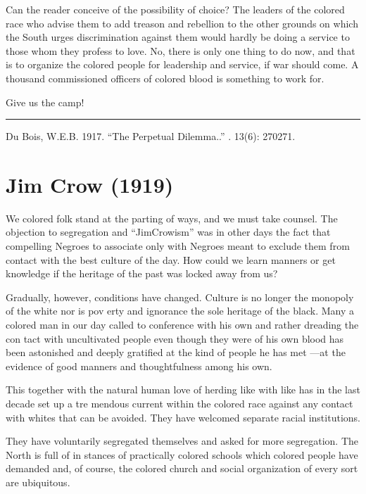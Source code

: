 \documentclass[letterpaper,10pt,english]{jupyterBook}
\begin{document}
\sphinxAtStartPar
Can the reader conceive of the pos­sibility of choice? The leaders of the colored race who advise them to add treason and rebellion to the other grounds on which the South urges discrimination against them would hardly be doing a service to those whom they profess to love. No, there is only one thing to do now, and that is to organize the colored people for leadership and service, if war should come. A thousand commissioned officers of colored blood is something to work for.

\sphinxAtStartPar
Give us the camp!


\bigskip\hrule\bigskip


\sphinxAtStartPar
{} Du Bois, W.E.B. 1917. “The Perpetual Dilemma..” . 13(6): 270\sphinxhyphen{}271.


\section{Jim Crow (1919)}
\label{\detokenize{Volumes/17/03/jim_crow:jim-crow-1919}}\label{\detokenize{Volumes/17/03/jim_crow::doc}}
\sphinxAtStartPar
We  colored folk stand at the parting of ways, and we must take counsel. The objection to segregation and “Jim\sphinxhyphen{}Crowism” was in other days the fact that compelling Ne­groes to associate only with Negroes meant to exclude them from contact with the best culture of the day. How could we learn manners or get knowledge if the heritage of the past was locked away from us?

\sphinxAtStartPar
Gradually, however, conditions have changed. Culture is no longer the monopoly of the white nor is pov­ erty and ignorance the sole heritage of the black. Many a colored man in our day called to conference with his own and rather dreading the con­ tact with uncultivated people even though they were of his own blood has been astonished and deeply grati­fied at the kind of people he has met —at the evidence of good manners and thoughtfulness among his own.

\sphinxAtStartPar
This together with the natural human love of herding like with like has in the last decade set up a tre­ mendous current within the colored race against any contact with whites that can be avoided. They have wel­comed separate racial institutions.

\sphinxAtStartPar
They have voluntarily segregated themselves and asked for more seg­regation. The North is full of in­ stances of practically colored schools which colored people have demanded and, of course, the colored church and social organization of every sort are ubiquitous.
\end{document}
